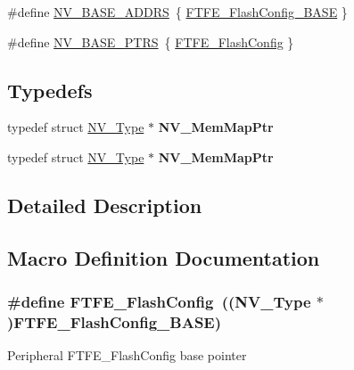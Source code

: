 \begin{DoxyCompactItemize}
\item 
\#define \hyperlink{group__NV__Peripheral__Access__Layer_ga59a94e9ecd6653c2a47bc205a8c0ba4c}{N\+V\+\_\+\+B\+A\+S\+E\+\_\+\+A\+D\+D\+RS}~\{ \hyperlink{group__NV__Peripheral__Access__Layer_ga10dc635084032a61ca68e3d242e3aaf0}{F\+T\+F\+E\+\_\+\+Flash\+Config\+\_\+\+B\+A\+SE} \}
\item 
\#define \hyperlink{group__NV__Peripheral__Access__Layer_ga1e44e66a8945b675dcebb6fbd6bdc85b}{N\+V\+\_\+\+B\+A\+S\+E\+\_\+\+P\+T\+RS}~\{ \hyperlink{group__NV__Peripheral__Access__Layer_ga834657fb01c008d200d4e0aaa7857a2f}{F\+T\+F\+E\+\_\+\+Flash\+Config} \}
\end{DoxyCompactItemize}
\subsection*{Typedefs}
\begin{DoxyCompactItemize}
\item 
typedef struct \hyperlink{structNV__Type}{N\+V\+\_\+\+Type} $\ast$ {\bfseries N\+V\+\_\+\+Mem\+Map\+Ptr}\hypertarget{group__NV__Peripheral__Access__Layer_gab450680c088433556921ae8fe3c35d3d}{}\label{group__NV__Peripheral__Access__Layer_gab450680c088433556921ae8fe3c35d3d}

\item 
typedef struct \hyperlink{structNV__Type}{N\+V\+\_\+\+Type} $\ast$ {\bfseries N\+V\+\_\+\+Mem\+Map\+Ptr}\hypertarget{group__NV__Peripheral__Access__Layer_gab450680c088433556921ae8fe3c35d3d}{}\label{group__NV__Peripheral__Access__Layer_gab450680c088433556921ae8fe3c35d3d}

\end{DoxyCompactItemize}


\subsection{Detailed Description}


\subsection{Macro Definition Documentation}
\subsubsection[{\texorpdfstring{F\+T\+F\+E\+\_\+\+Flash\+Config}{FTFE_FlashConfig}}]{\setlength{\rightskip}{0pt plus 5cm}\#define F\+T\+F\+E\+\_\+\+Flash\+Config~(({\bf N\+V\+\_\+\+Type} $\ast$){\bf F\+T\+F\+E\+\_\+\+Flash\+Config\+\_\+\+B\+A\+SE})}\hypertarget{group__NV__Peripheral__Access__Layer_ga834657fb01c008d200d4e0aaa7857a2f}{}\label{group__NV__Peripheral__Access__Layer_ga834657fb01c008d200d4e0aaa7857a2f}
Peripheral F\+T\+F\+E\+\_\+\+Flash\+Config base pointer 
